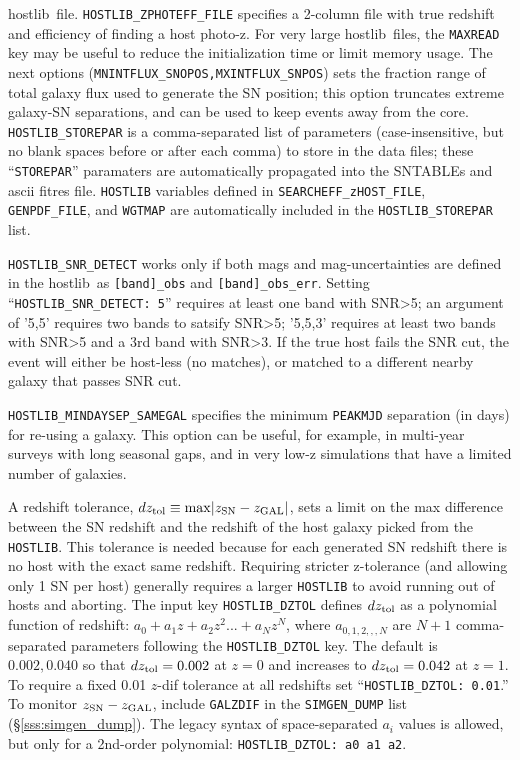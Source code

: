 \documentclass[12pt]{article}
\newcommand{\hostlib}{{\sc hostlib}}
\begin{document}
{\hostlib\ file. 
{\tt HOSTLIB\_ZPHOTEFF\_FILE} specifies a 2-column file with
true redshift and efficiency of finding a host photo-z.
For very large \hostlib\ files,
the {\tt MAXREAD} key may be useful to reduce the 
initialization time or limit memory usage.
The next options ({\tt MNINTFLUX\_SNOPOS,MXINTFLUX\_SNPOS}) sets the
fraction range of total galaxy flux used to generate the
SN position; this option truncates extreme galaxy-SN
separations, and can be used to keep events away from the core.
{\tt HOSTLIB\_STOREPAR} is a comma-separated
list of parameters (case-insensitive, but no blank spaces
before or after each comma) to store in the data files;
these ``{\tt STOREPAR}'' paramaters are automatically propagated 
into the SNTABLEs  and ascii fitres file.
{\tt HOSTLIB} variables defined in 
{\tt SEARCHEFF\_zHOST\_FILE},
{\tt GENPDF\_FILE}, and
{\tt WGTMAP}
are automatically included in the {\tt HOSTLIB\_STOREPAR} list.


{\tt HOSTLIB\_SNR\_DETECT} works only if both mags and mag-uncertainties
are defined in the \hostlib\ as {\tt [band]\_obs} and {\tt [band]\_obs\_err}.
Setting ``{\tt HOSTLIB\_SNR\_DETECT: 5}'' requires at least one band with
SNR>5; an argument of '5,5' requires two bands to satsify SNR>5;
'5,5,3' requires at least two bands with SNR>5 and a 3rd band with SNR>3.
If the true host fails the SNR cut, the event will either be host-less
(no matches), or matched to a different nearby galaxy that
passes SNR cut.

{\tt HOSTLIB\_MINDAYSEP\_SAMEGAL} specifies the minimum
{\tt PEAKMJD} separation (in days) for re-using a galaxy.
This option can be useful, for example, in multi-year surveys 
with long seasonal gaps, and in very low-z simulations that have 
a limited number of galaxies.


\newcommand{\dztol}{dz_{\rm tol}}
A redshift tolerance, 
$\dztol \equiv {\rm max}|z_{\rm SN} - z_{\rm GAL}|$,
sets a limit on the max difference between the SN redshift
and the redshift of the host galaxy picked from the {\tt HOSTLIB}.
This tolerance is needed because for each generated SN redshift there 
is no host with the exact same redshift. Requiring stricter
z-tolerance (and allowing only 1 SN per host) generally
requires a larger {\tt HOSTLIB} to avoid running out of
hosts and aborting. The input key {\tt HOSTLIB\_DZTOL}
defines $\dztol$ as a polynomial function of redshift:
$a_0 + a_1z + a_2z^2 ... + a_Nz^N$, 
where $a_{0,1,2,,,N}$ are $N+1$ comma-separated parameters
following the {\tt HOSTLIB\_DZTOL} key.
The default is $0.002,0.040$ so that
$\dztol=  0.002$ at $z=0$ and increases to $\dztol= 0.042$ at $z=1$.
To require a fixed 0.01 $z$-dif tolerance at all redshifts set
``{\tt HOSTLIB\_DZTOL: 0.01}.''
To monitor $z_{\rm SN} - z_{\rm GAL}$,
include {\tt GALZDIF} in the {\tt SIMGEN\_DUMP} list
(\S\ref{sss:simgen_dump}).
The legacy syntax of space-separated $a_i$ values is allowed,
but only for a 2nd-order polynomial: 
{\tt HOSTLIB\_DZTOL: a0 a1 a2}.

}
\end{document}
